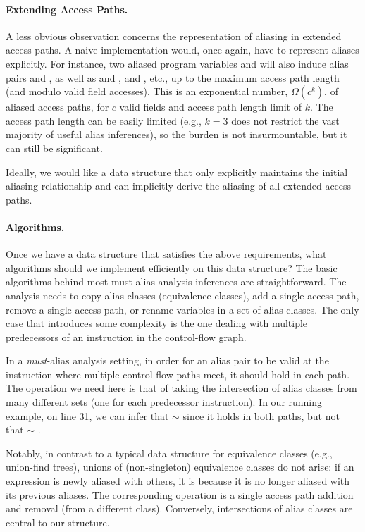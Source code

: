 \paragraph{Extending Access Paths.} A less obvious observation concerns the
representation of aliasing in extended access paths. A naive implementation
would, once again, have to represent aliases explicitly.  For instance, two
aliased program variables  and  will also induce alias pairs
 and , as well as  and ,  and
, etc., up to the maximum access path length (and modulo valid field
accesses). This is an exponential number, $\Omega(c^k)$, of aliased access
paths, for $c$ valid fields and access path length limit of $k$. The access
path length can be easily limited (e.g., $k = 3$ does not restrict the vast
majority of useful alias inferences), so the burden is not insurmountable, but
it can still be significant.

Ideally, we would like a data structure that only explicitly maintains the
initial aliasing relationship and can implicitly derive the aliasing of all
extended access paths.

\paragraph{Algorithms.} Once we have a data structure that satisfies the above
requirements, what algorithms should we implement efficiently on this data
structure? The basic algorithms behind most must-alias analysis inferences are
straightforward. The analysis needs to copy alias classes (equivalence classes),
add a single access path, remove a single access path, or rename variables in a set
of alias classes. The only case that introduces some complexity is the one
dealing with multiple predecessors of an instruction in the control-flow graph.

In a \emph{must}-alias analysis setting, in order for an alias pair to be valid
at the instruction where multiple control-flow paths meet, it should hold in
each path. The operation we need here is that of taking the intersection of
alias classes from many different sets (one for each predecessor instruction).
In our running example, on line 31, we can infer that  $\sim$
 since it holds in both paths, but not that  $\sim$ .

Notably, in contrast to a typical data structure for equivalence
classes (e.g., union-find trees), unions of (non-singleton)
equivalence classes do not arise: if an expression is newly aliased
with others, it is because it is no longer aliased with its previous
aliases. The corresponding operation is a single access path addition
and removal (from a different class). Conversely, intersections of
alias classes are central to our structure.

